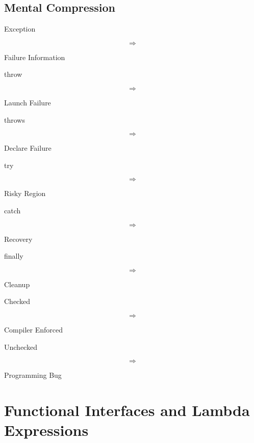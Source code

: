\documentclass[11pt,a4paper]{book}
\begin{document}

\section{Mental Compression}

Exception

\[
\Rightarrow
\]

Failure Information


throw

\[
\Rightarrow
\]

Launch Failure


throws

\[
\Rightarrow
\]

Declare Failure


try

\[
\Rightarrow
\]

Risky Region


catch

\[
\Rightarrow
\]

Recovery


finally

\[
\Rightarrow
\]

Cleanup


Checked

\[
\Rightarrow
\]

Compiler Enforced


Unchecked

\[
\Rightarrow
\]

Programming Bug
\chapter{Functional Interfaces and Lambda Expressions}
\end{document}
